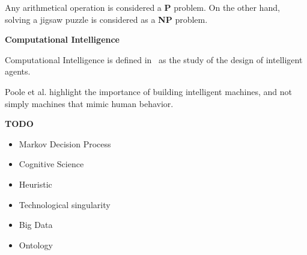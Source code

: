 \documentclass[titlepage, letterpaper, fleqn]{article}
\newcommand{\spacepls}{\vspace{5mm}}
\newcommand{\defys}[1]{
	\spacepls %
	\textbf{#1}
}
\begin{document}
Any arithmetical operation is considered a \textbf{P} problem. On the other hand, solving a jigsaw puzzle is considered as a \textbf{NP} problem.

\defys{Computational Intelligence}

Computational Intelligence is defined in~\cite{CI} as the study of the design of intelligent agents.

Poole et al. highlight the importance of building intelligent machines, and not simply machines that mimic human behavior.

\textbf{TODO}

\begin{itemize}
	\item Markov Decision Process
	\item Cognitive Science
	\item Heuristic
	\item Technological singularity
	\item Big Data
	\item Ontology
\end{itemize}


\end{document}
